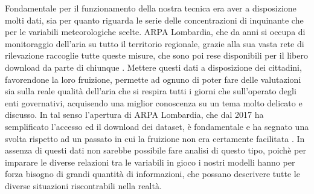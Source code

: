 \documentclass[a4paper]{report}
\begin{document}
Fondamentale per il funzionamento della nostra tecnica era aver a disposizione molti dati, sia per quanto riguarda le serie delle concentrazioni di inquinante che per le variabili meteorologiche scelte. ARPA Lombardia, che da anni si occupa di monitoraggio dell'aria su tutto il territorio regionale, grazie alla sua vasta rete di rilevazione raccoglie tutte queste misure, che sono poi rese disponibili per il libero download
da parte di chiunque \cite{arpa_aria, arpa_meteo}. Mettere questi dati a disposizione dei cittadini, favorendone la loro fruizione, permette ad ognuno di poter fare delle valutazioni sia sulla reale qualità dell'aria che si respira tutti i giorni che sull'operato degli enti governativi, acquisendo una miglior conoscenza su un tema molto delicato e discusso. In tal senso l'apertura di ARPA Lombardia, che dal 2017 ha semplificato l'accesso ed il download dei dataset, è fondamentale e ha segnato una svolta rispetto ad un passato in cui la fruizione non era certamente facilitata \cite{trentini2014lombardy}. 
In assenza di questi dati non sarebbe possibile fare analisi di questo tipo, poichè per imparare le diverse relazioni tra le variabili in gioco i nostri modelli hanno per forza bisogno di grandi quantità di informazioni, che possano descrivere tutte le diverse situazioni riscontrabili nella realtà.

\end{document}
